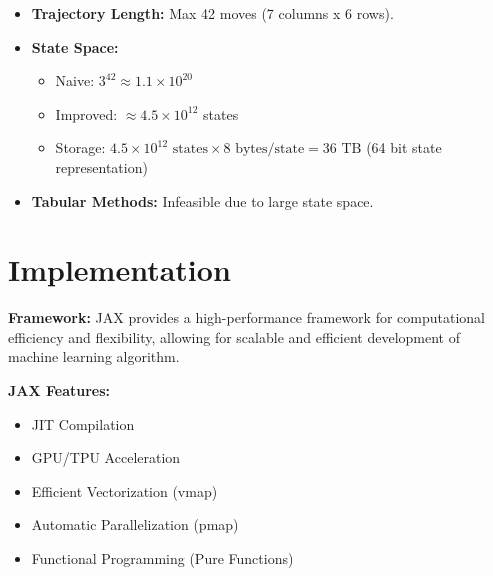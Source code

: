 \documentclass[aspectratio=169,xcolor=dvipsnames]{beamer}
\begin{document}
\begin{frame}{}
    \begin{itemize}
        \item \textbf{Trajectory Length:} Max 42 moves (7 columns x 6 rows).
        \item \textbf{State Space:}
            \begin{itemize}
                \item Naive: $3^{42} \approx 1.1 \times 10^{20}$
                \item Improved: $\approx 4.5 \times 10^{12}$ states
                \item Storage: $4.5 \times 10^{12} \text{ states} \times 8 \text{ bytes/state} = 36 \text{ TB}$ (64 bit state representation)
            \end{itemize}
        \item \textbf{Tabular Methods:} Infeasible due to large state space.
    \end{itemize}
\end{frame}

\section{Implementation}

\begin{frame}{}

\textbf{Framework:} JAX provides a high-performance framework for computational efficiency and flexibility, allowing for scalable and efficient development of machine learning algorithm.

\vspace{2.5em}

\textbf{JAX Features:}
\begin{itemize}
    \item JIT Compilation
    \item GPU/TPU Acceleration
    \item Efficient Vectorization (vmap)
    \item Automatic Parallelization (pmap)
    \item Functional Programming (Pure Functions)
\end{itemize}
\end{frame}
\end{document}

